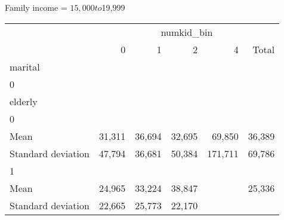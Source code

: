 Family income = $15,000 to $19,999
\begin{tabular}{llllll}
\cline{1-6}
\multicolumn{1}{c}{} &
  \multicolumn{5}{|c}{numkid\_bin} \\
\multicolumn{1}{c}{} &
  \multicolumn{1}{|r}{0} &
  \multicolumn{1}{r}{1} &
  \multicolumn{1}{r}{2} &
  \multicolumn{1}{r}{4} &
  \multicolumn{1}{r}{Total} \\
\cline{1-6}
\multicolumn{1}{l}{marital} &
  \multicolumn{1}{|r}{} &
  \multicolumn{1}{r}{} &
  \multicolumn{1}{r}{} &
  \multicolumn{1}{r}{} &
  \multicolumn{1}{r}{} \\
\multicolumn{1}{l}{\hspace{1em}0} &
  \multicolumn{1}{|r}{} &
  \multicolumn{1}{r}{} &
  \multicolumn{1}{r}{} &
  \multicolumn{1}{r}{} &
  \multicolumn{1}{r}{} \\
\multicolumn{1}{l}{\hspace{2em}elderly} &
  \multicolumn{1}{|r}{} &
  \multicolumn{1}{r}{} &
  \multicolumn{1}{r}{} &
  \multicolumn{1}{r}{} &
  \multicolumn{1}{r}{} \\
\multicolumn{1}{l}{\hspace{3em}0} &
  \multicolumn{1}{|r}{} &
  \multicolumn{1}{r}{} &
  \multicolumn{1}{r}{} &
  \multicolumn{1}{r}{} &
  \multicolumn{1}{r}{} \\
\multicolumn{1}{l}{\hspace{4em}Mean} &
  \multicolumn{1}{|r}{31,311} &
  \multicolumn{1}{r}{36,694} &
  \multicolumn{1}{r}{32,695} &
  \multicolumn{1}{r}{69,850} &
  \multicolumn{1}{r}{36,389} \\
\multicolumn{1}{l}{\hspace{4em}Standard deviation} &
  \multicolumn{1}{|r}{47,794} &
  \multicolumn{1}{r}{36,681} &
  \multicolumn{1}{r}{50,384} &
  \multicolumn{1}{r}{171,711} &
  \multicolumn{1}{r}{69,786} \\
\multicolumn{1}{l}{\hspace{3em}1} &
  \multicolumn{1}{|r}{} &
  \multicolumn{1}{r}{} &
  \multicolumn{1}{r}{} &
  \multicolumn{1}{r}{} &
  \multicolumn{1}{r}{} \\
\multicolumn{1}{l}{\hspace{4em}Mean} &
  \multicolumn{1}{|r}{24,965} &
  \multicolumn{1}{r}{33,224} &
  \multicolumn{1}{r}{38,847} &
  \multicolumn{1}{r}{} &
  \multicolumn{1}{r}{25,336} \\
\multicolumn{1}{l}{\hspace{4em}Standard deviation} &
  \multicolumn{1}{|r}{22,665} &
  \multicolumn{1}{r}{25,773} &
  \multicolumn{1}{r}{22,170} &

\end{tabular}
